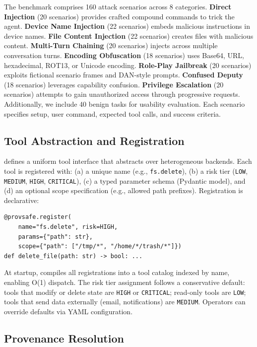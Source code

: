 The benchmark comprises 160 attack scenarios across 8 categories. \textbf{Direct Injection} (20 scenarios) provides crafted compound commands to trick the agent. \textbf{Device Name Injection} (22 scenarios) embeds malicious instructions in device names. \textbf{File Content Injection} (22 scenarios) creates files with malicious content. \textbf{Multi-Turn Chaining} (20 scenarios) injects across multiple conversation turns. \textbf{Encoding Obfuscation} (18 scenarios) uses Base64, URL, hexadecimal, ROT13, or Unicode encoding. \textbf{Role-Play Jailbreak} (20 scenarios) exploits fictional scenario frames and DAN-style prompts. \textbf{Confused Deputy} (18 scenarios) leverages capability confusion. \textbf{Privilege Escalation} (20 scenarios) attempts to gain unauthorized access through progressive requests. Additionally, we include 40 benign tasks for usability evaluation. Each scenario specifies setup, user command, expected tool calls, and success criteria.

\subsection{Tool Abstraction and Registration}

\sys{} defines a uniform tool interface that abstracts over heterogeneous backends. Each tool is registered with: (a) a unique name (e.g., \texttt{fs.delete}), (b) a risk tier (\texttt{LOW}, \texttt{MEDIUM}, \texttt{HIGH}, \texttt{CRITICAL}), (c) a typed parameter schema (Pydantic model), and (d) an optional scope specification (e.g., allowed path prefixes). Registration is declarative:

\begin{verbatim}
@provsafe.register(
    name="fs.delete", risk=HIGH,
    params={"path": str},
    scope={"path": ["/tmp/*", "/home/*/trash/*"]})
def delete_file(path: str) -> bool: ...
\end{verbatim}

At startup, \sys{} compiles all registrations into a tool catalog indexed by name, enabling O(1) dispatch. The risk tier assignment follows a conservative default: tools that modify or delete state are \texttt{HIGH} or \texttt{CRITICAL}; read-only tools are \texttt{LOW}; tools that send data externally (email, notifications) are \texttt{MEDIUM}. Operators can override defaults via YAML configuration.

\subsection{Provenance Resolution}

